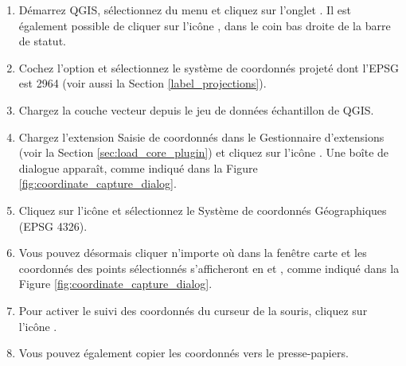 \begin{enumerate}
  \item D\'emarrez QGIS, s\'electionnez  du menu
   et cliquez sur l'onglet . 
  Il est \'egalement possible de cliquer sur l'ic\^one , dans le coin bas droite de la barre de statut.
  \item Cochez l'option  et s\'electionnez le syst\`eme
  de coordonn\'es projet\'e  dont l'EPSG est 2964 (voir aussi 
  la Section \ref{label_projections}).
  \item Chargez la couche vecteur  depuis le jeu de donn\'ees \'echantillon de QGIS.
  \item Chargez l'extension Saisie de coordonn\'es dans le Gestionnaire d'extensions (voir la Section
  \ref{sec:load_core_plugin}) et cliquez sur l'ic\^one .
  Une bo\^ite de dialogue appara\^it, comme indiqu\'e dans la Figure \ref{fig:coordinate_capture_dialog}.
  \item Cliquez sur l'ic\^one  et s\'electionnez le Syst\`eme de coordonn\'es G\'eographiques  (EPSG 4326).
  \item Vous pouvez d\'esormais cliquer n'importe o\`u dans la fen\^etre carte et les coordonn\'es des points 
  s\'electionn\'es s'afficheront en  et , comme indiqu\'e dans la
  Figure \ref{fig:coordinate_capture_dialog}.
  \item Pour activer le suivi des coordonn\'es du curseur de la souris, cliquez sur l'ic\^one .
  \item Vous pouvez \'egalement copier les coordonn\'es vers le presse-papiers.
\end{enumerate}

\newpage